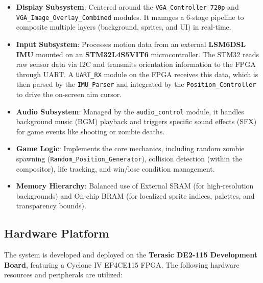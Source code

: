 \documentclass[12pt,a4paper]{article}
\begin{document}
\begin{itemize}
    \item \textbf{Display Subsystem}: Centered around the \texttt{VGA\_Controller\_\allowbreak 720p} and \texttt{VGA\_Image\_\allowbreak Overlay\_Combined} modules. It manages a 6-stage pipeline to composite multiple layers (background, sprites, and UI) in real-time.
    \item \textbf{Input Subsystem}: Processes motion data from an external \textbf{LSM6DSL IMU} mounted on an \textbf{STM32L4S5VIT6} microcontroller. The STM32 reads raw sensor data via I2C and transmits orientation information to the FPGA through UART. A \texttt{UART\_RX} module on the FPGA receives this data, which is then parsed by the \texttt{IMU\_Parser} and integrated by the \texttt{Position\_Controller} to drive the on-screen aim cursor.
    \item \textbf{Audio Subsystem}: Managed by the \texttt{audio\_control} module, it handles background music (BGM) playback and triggers specific sound effects (SFX) for game events like shooting or zombie deaths.
    \item \textbf{Game Logic}: Implements the core mechanics, including random zombie spawning (\texttt{Random\_Position\_Generator}), collision detection (within the compositor), life tracking, and win/lose condition management.
    \item \textbf{Memory Hierarchy}: Balanced use of External SRAM (for high-resolution backgrounds) and On-chip BRAM (for localized sprite indices, palettes, and transparency bounds).
\end{itemize}

\subsection{Hardware Platform}

The system is developed and deployed on the \textbf{Terasic DE2-115 Development Board}, featuring a Cyclone IV EP4CE115 FPGA. The following hardware resources and peripherals are utilized:
\end{document}
